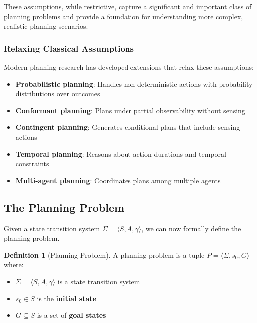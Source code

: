 \documentclass[11pt,a4paper]{article}
\theoremstyle{definition}
\newtheorem{definition}{Definition}[section]
\theoremstyle{plain}
\theoremstyle{remark}
\begin{document}
These assumptions, while restrictive, capture a significant and important class of planning problems and provide a foundation for understanding more complex, realistic planning scenarios.

\subsubsection{Relaxing Classical Assumptions}

Modern planning research has developed extensions that relax these assumptions:

\begin{itemize}
    \item \textbf{Probabilistic planning}: Handles non-deterministic actions with probability distributions over outcomes
    \item \textbf{Conformant planning}: Plans under partial observability without sensing
    \item \textbf{Contingent planning}: Generates conditional plans that include sensing actions
    \item \textbf{Temporal planning}: Reasons about action durations and temporal constraints
    \item \textbf{Multi-agent planning}: Coordinates plans among multiple agents
\end{itemize}

\newpage

\subsection{The Planning Problem}

Given a state transition system $\Sigma = \langle S, A, \gamma \rangle$, we can now formally define the planning problem.

\begin{tcolorbox}[colback=green!5!white,colframe=green!75!black,title=\textbf{Planning Problem}]
\begin{definition}[Planning Problem]
A planning problem is a tuple $P = \langle \Sigma, s_0, G \rangle$ where:
\begin{itemize}
    \item $\Sigma = \langle S, A, \gamma \rangle$ is a state transition system
    \item $s_0 \in S$ is the \textbf{initial state}
    \item $G \subseteq S$ is a set of \textbf{goal states}
\end{itemize}
\end{definition}
\end{tcolorbox}
\end{document}
